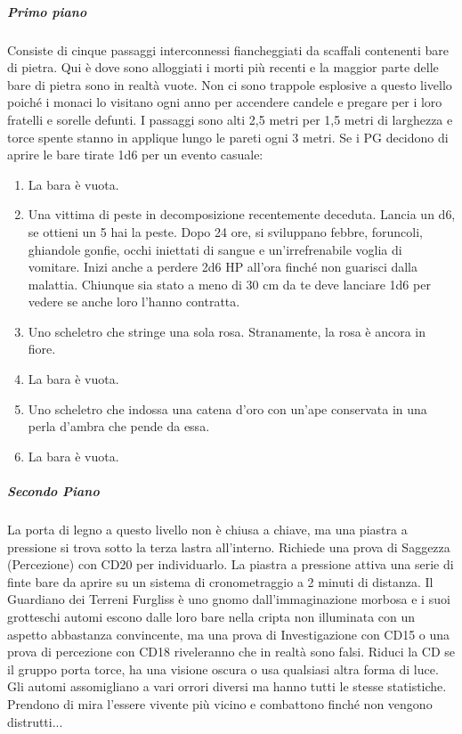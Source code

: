 \documentclass{article}
\begin{document}
\subparagraph{Primo piano}
    Consiste di cinque passaggi interconnessi fiancheggiati da scaffali contenenti bare di pietra. Qui è dove sono alloggiati i morti più recenti e la maggior parte delle bare di pietra sono in realtà vuote. Non ci sono trappole esplosive a questo livello poiché i monaci lo visitano ogni anno per accendere candele e pregare per i loro fratelli e sorelle defunti. I passaggi sono alti 2,5 metri per 1,5 metri di larghezza e torce spente stanno in applique lungo le pareti ogni 3 metri.
    Se i PG decidono di aprire le bare tirate 1d6 per un evento casuale:
    \begin{enumerate}
        \item La bara è vuota.
        \item Una vittima di peste in decomposizione recentemente deceduta. Lancia un d6, se ottieni un 5 hai la peste. Dopo 24 ore, si sviluppano febbre, foruncoli, ghiandole gonfie, occhi iniettati di sangue e un'irrefrenabile voglia di vomitare. Inizi anche a perdere 2d6 HP all'ora finché non guarisci dalla malattia. Chiunque sia stato a meno di 30 cm da te deve lanciare 1d6 per vedere se anche loro l'hanno contratta.
        \item Uno scheletro che stringe una sola rosa. Stranamente, la rosa è ancora in fiore.
        \item La bara è vuota.
        \item Uno scheletro che indossa una catena d'oro con un'ape conservata in una perla d'ambra che pende da essa.
        \item La bara è vuota.
    \end{enumerate}
    \subparagraph{Secondo Piano}
    La porta di legno a questo livello non è chiusa a chiave, ma una piastra a pressione si trova sotto la terza lastra all'interno. Richiede una prova di Saggezza (Percezione) con CD20 per individuarlo.
La piastra a pressione attiva una serie di finte bare da aprire su un sistema di cronometraggio a 2 minuti di distanza. Il Guardiano dei Terreni Furgliss è uno gnomo dall'immaginazione morbosa e i suoi grotteschi automi escono dalle loro bare nella cripta non illuminata con un aspetto abbastanza convincente, ma una prova di Investigazione con CD15 o una prova di percezione con CD18 riveleranno che in realtà sono falsi. Riduci la CD se il gruppo porta torce, ha una visione oscura o usa qualsiasi altra forma di luce. Gli automi assomigliano a vari orrori diversi ma hanno tutti le stesse statistiche. Prendono di mira l'essere vivente più vicino e combattono finché non vengono distrutti...\\
\end{document}
